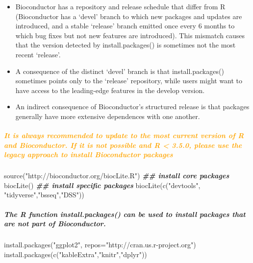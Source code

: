 \documentclass[
]{article}
\newenvironment{Shaded}{\begin{snugshade}}{\end{snugshade}}
\newcommand{\AttributeTok}[1]{\textcolor[rgb]{0.77,0.63,0.00}{#1}}
\newcommand{\DocumentationTok}[1]{\textcolor[rgb]{0.56,0.35,0.01}{\textbf{\textit{#1}}}}
\newcommand{\FunctionTok}[1]{\textcolor[rgb]{0.00,0.00,0.00}{#1}}
\newcommand{\NormalTok}[1]{#1}
\newcommand{\StringTok}[1]{\textcolor[rgb]{0.31,0.60,0.02}{#1}}
\begin{document}
\begin{itemize}
\item
  Bioconductor has a repository and release schedule that differ from R
  (Bioconductor has a `devel' branch to which new packages and updates
  are introduced, and a stable `release' branch emitted once every 6
  months to which bug fixes but not new features are introduced). This
  mismatch causes that the version detected by install.packages() is
  sometimes not the most recent `release'.
\item
  A consequence of the distinct `devel' branch is that
  install.packages() sometimes points only to the `release' repository,
  while users might want to have access to the leading-edge features in
  the develop version.
\item
  An indirect consequence of Bioconductor's structured release is that
  packages generally have more extensive dependences with one another.
\end{itemize}

\hypertarget{section}{%
\subparagraph{\texorpdfstring{\textcolor{orange}{It is always recommended to update to the most current version of R and Bioconductor. If it is not possible and R < 3.5.0, please use the legacy approach to install Bioconductor packages}}{}}\label{section}}

\begin{Shaded}
\begin{Highlighting}[]
\FunctionTok{source}\NormalTok{(}\StringTok{"http://bioconductor.org/biocLite.R"}\NormalTok{)}
\DocumentationTok{\#\# install core packages}
\FunctionTok{biocLite}\NormalTok{()}
\DocumentationTok{\#\# install specific packages}
\FunctionTok{biocLite}\NormalTok{(}\FunctionTok{c}\NormalTok{(}\StringTok{"devtools"}\NormalTok{, }\StringTok{"tidyverse"}\NormalTok{,}\StringTok{"bsseq"}\NormalTok{,}\StringTok{"DSS"}\NormalTok{))}
\end{Highlighting}
\end{Shaded}

\hypertarget{the-r-function-install.packages-can-be-used-to-install-packages-that-are-not-part-of-bioconductor.}{%
\subparagraph{The R function install.packages() can be used to install
packages that are not part of
Bioconductor.}\label{the-r-function-install.packages-can-be-used-to-install-packages-that-are-not-part-of-bioconductor.}}

\begin{Shaded}
\begin{Highlighting}[]
\FunctionTok{install.packages}\NormalTok{(}\StringTok{"ggplot2"}\NormalTok{, }\AttributeTok{repos=}\StringTok{"http://cran.us.r{-}project.org"}\NormalTok{)}
\FunctionTok{install.packages}\NormalTok{(}\FunctionTok{c}\NormalTok{(}\StringTok{"kableExtra"}\NormalTok{,}\StringTok{"knitr"}\NormalTok{,}\StringTok{"dplyr"}\NormalTok{))}
\end{Highlighting}
\end{Shaded}
\end{document}
